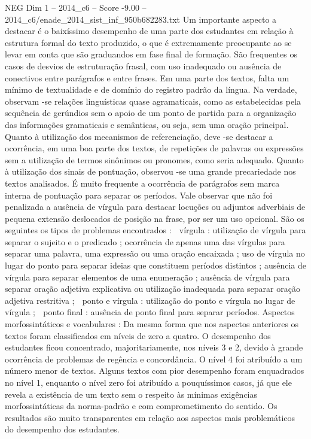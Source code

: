 \begin{textsample}{NEG Dim 1 – 2014\_c6 – Score -9.00 – 2014\_c6/enade\_2014\_sist\_inf\_950b682283.txt}
Um importante aspecto a destacar é o baixíssimo desempenho de uma parte dos estudantes em relação à estrutura formal do texto produzido, o que é extremamente preocupante ao se levar em conta que são graduandos em fase final de formação.
São frequentes os casos de desvios de estruturação frasal, com uso inadequado ou ausência de conectivos entre parágrafos e entre frases.
Em uma parte dos textos, falta um mínimo de textualidade e de domínio do registro padrão da língua.
Na verdade, observam -se relações linguísticas quase agramaticais, como as estabelecidas pela sequência de gerúndios sem o apoio de um ponto de partida para a organização das informações gramaticais e semânticas, ou seja, sem uma oração principal.
Quanto à utilização dos mecanismos de referenciação, deve -se destacar a ocorrência, em uma boa parte dos textos, de repetições de palavras ou expressões sem a utilização de termos sinônimos ou pronomes, como seria adequado.
Quanto à utilização dos sinais de pontuação, observou -se uma grande precariedade nos textos analisados.
É muito frequente a ocorrência de parágrafos sem marca interna de pontuação para separar os períodos.
Vale observar que não foi penalizada a ausência de vírgula para destacar locuções ou adjuntos adverbiais de pequena extensão deslocados de posição na frase, por ser um uso opcional.
São os seguintes os tipos de problemas encontrados :  vírgula : utilização de vírgula para separar o sujeito e o predicado ; ocorrência de apenas uma das vírgulas para separar uma palavra, uma expressão ou uma oração encaixada ; uso de vírgula no lugar do ponto para separar ideias que constituem períodos distintos ; ausência de vírgula para separar elementos de uma enumeração ; ausência de vírgula para separar oração adjetiva explicativa ou utilização inadequada para separar oração adjetiva restritiva ;  ponto e vírgula : utilização do ponto e vírgula no lugar de vírgula ;  ponto final : ausência de ponto final para separar períodos.
Aspectos morfossintáticos e vocabulares : Da mesma forma que nos aspectos anteriores os textos foram classificados em níveis de zero a quatro.
O desempenho dos estudantes ficou concentrado, majoritariamente, nos níveis 3 e 2, devido à grande ocorrência de problemas de regência e concordância.
O nível 4 foi atribuído a um número menor de textos.
Alguns textos com pior desempenho foram enquadrados no nível 1, enquanto o nível zero foi atribuído a pouquíssimos casos, já que ele revela a existência de um texto sem o respeito às mínimas exigências morfossintáticas da norma-padrão e com comprometimento do sentido.
Os resultados são muito transparentes em relação aos aspectos mais problemáticos do desempenho dos estudantes.

\end{textsample}
